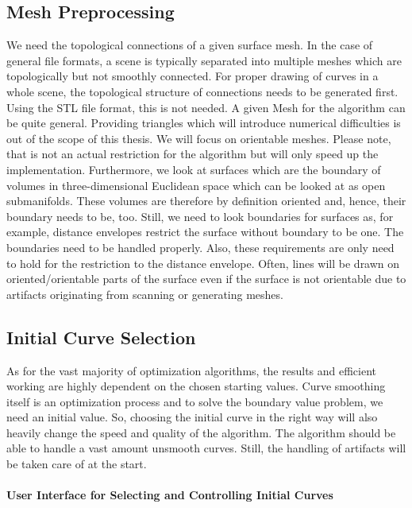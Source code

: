 \documentclass{stdlocal}
\begin{document}
\subsection{Mesh Preprocessing} %
\label{sub:mesh_preprocessing}
  We need the topological connections of a given surface mesh.
  In the case of general file formats, a scene is typically separated into multiple meshes which are topologically but not smoothly connected.
  For proper drawing of curves in a whole scene, the topological structure of connections needs to be generated first.
  Using the STL file format, this is not needed.
  A given Mesh for the algorithm can be quite general.
  Providing triangles which will introduce numerical difficulties is out of the scope of this thesis.
  We will focus on orientable meshes.
  Please note, that is not an actual restriction for the algorithm but will only speed up the implementation.
  Furthermore, we look at surfaces which are the boundary of volumes in three-dimensional Euclidean space which can be looked at as open submanifolds.
  These volumes are therefore by definition oriented and, hence, their boundary needs to be, too.
  Still, we need to look boundaries for surfaces as, for example, distance envelopes restrict the surface without boundary to be one.
  The boundaries need to be handled properly.
  Also, these requirements are only need to hold for the restriction to the distance envelope.
  Often, lines will be drawn on oriented/orientable parts of the surface even if the surface is not orientable due to artifacts originating from scanning or generating meshes.

\subsection{Initial Curve Selection} %
\label{sub:initial_curve_selection}
  As for the vast majority of optimization algorithms, the results and efficient working are highly dependent on the chosen starting values.
  Curve smoothing itself is an optimization process and to solve the boundary value problem, we need an initial value.
  So, choosing the initial curve in the right way will also heavily change the speed and quality of the algorithm.
  The algorithm should be able to handle a vast amount unsmooth curves.
  Still, the handling of artifacts will be taken care of at the start.
  \paragraph{User Interface for Selecting and Controlling Initial Curves}
\end{document}
